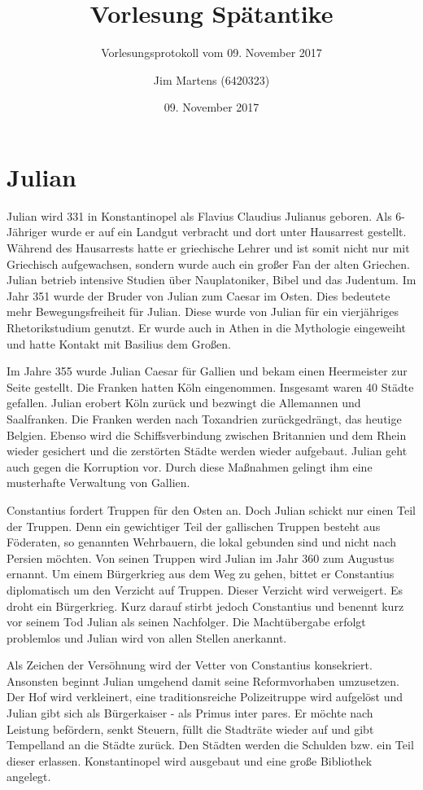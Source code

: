 \documentclass[10pt,a4paper,oneside,ngerman,numbers=noenddot]{scrartcl}
\begin{document}
\author{Jim Martens (6420323)}
\title{Vorlesung Spätantike}
\subtitle{Vorlesungsprotokoll vom 09. November 2017}
\date{09. November 2017}
\maketitle

\section*{Julian}

Julian wird 331 in Konstantinopel als Flavius Claudius Julianus geboren.
Als 6-Jähriger wurde er auf ein Landgut verbracht und dort unter Hausarrest
gestellt. Während des Hausarrests hatte er griechische Lehrer und ist somit
nicht nur mit Griechisch aufgewachsen, sondern wurde auch ein großer Fan der
alten Griechen. Julian betrieb intensive Studien über Nauplatoniker, Bibel und
das Judentum. Im Jahr 351 wurde der Bruder von Julian zum Caesar im Osten.
Dies bedeutete mehr Bewegungsfreiheit für Julian. Diese wurde von Julian für
ein vierjähriges Rhetorikstudium genutzt. Er wurde auch in Athen in die Mythologie
eingeweiht und hatte Kontakt mit Basilius dem Großen.

Im Jahre 355 wurde Julian Caesar für Gallien und bekam einen Heermeister zur
Seite gestellt. Die Franken hatten Köln eingenommen. Insgesamt waren 40 Städte
gefallen. Julian erobert Köln zurück und bezwingt die Allemannen und Saalfranken.
Die Franken werden nach Toxandrien zurückgedrängt, das heutige Belgien. Ebenso
wird die Schiffsverbindung zwischen Britannien und dem Rhein wieder gesichert
und die zerstörten Städte werden wieder aufgebaut. Julian geht auch gegen die
Korruption vor. Durch diese Maßnahmen gelingt ihm eine musterhafte Verwaltung von
Gallien.

Constantius fordert Truppen für den Osten an. Doch Julian schickt nur einen Teil
der Truppen. Denn ein gewichtiger Teil der gallischen Truppen besteht aus Föderaten,
so genannten Wehrbauern, die lokal gebunden sind und nicht nach Persien möchten.
Von seinen Truppen wird Julian im Jahr 360 zum Augustus ernannt. Um einem Bürgerkrieg
aus dem Weg zu gehen, bittet er Constantius diplomatisch um den Verzicht auf
Truppen. Dieser Verzicht wird verweigert. Es droht ein Bürgerkrieg. Kurz darauf
stirbt jedoch Constantius und benennt kurz vor seinem Tod Julian als seinen
Nachfolger. Die Machtübergabe erfolgt problemlos und Julian wird von allen
Stellen anerkannt.

Als Zeichen der Versöhnung wird der Vetter von Constantius konsekriert. Ansonsten
beginnt Julian umgehend damit seine Reformvorhaben umzusetzen. Der Hof wird
verkleinert, eine traditionsreiche Polizeitruppe wird aufgelöst und Julian gibt
sich als Bürgerkaiser - als Primus inter pares. Er möchte nach Leistung befördern,
senkt Steuern, füllt die Stadträte wieder auf und gibt Tempelland an die Städte
zurück. Den Städten werden die Schulden bzw. ein Teil dieser erlassen. Konstantinopel
wird ausgebaut und eine große Bibliothek angelegt.
\end{document}
